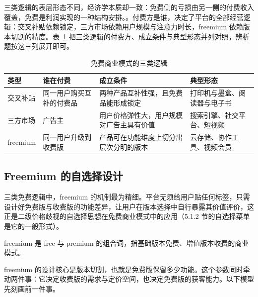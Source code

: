 三类逻辑的表层形态不同，经济学本质却一致：免费侧的亏损由另一侧的付费收入覆盖，免费是利润实现的一种结构安排。。付费方是谁，决定了平台的全部经营逻辑：交叉补贴依赖锁定，三方市场依赖用户规模与注意力时长，freemium 依赖版本切割的精度。表~\ref{tab:freemodel} 把三类逻辑的付费方、成立条件与典型形态并列对照，辨析题按这三列展开即可。

\begin{table}[H]
\centering
\setlength{\tabcolsep}{4pt}
\caption{免费商业模式的三类逻辑}
\label{tab:freemodel}
\begin{tabular}{p{1.8cm}p{3.0cm}p{3.6cm}p{3.0cm}}
\hline
\textbf{类型} & \textbf{谁在付费} & \textbf{成立条件} & \textbf{典型形态} \\
\hline
交叉补贴 & 同一用户购买互补的付费品 & 两种产品互补性强，且免费品能形成锁定 & 打印机与墨盒、阅读器与电子书 \\
三方市场 & 广告主 & 用户价格弹性大，用户规模对广告主具有价值 & 搜索引擎、社交平台、短视频 \\
freemium & 同一用户升级到收费版 & 产品可在功能维度上切分出层次分明的版本 & 云存储、协作工具、视频会员 \\
\hline
\end{tabular}
\end{table}

\subsection{Freemium 的自选择设计}

三类免费逻辑中，freemium 的机制最为精细。平台无须给用户贴任何标签，只需设计好免费版与收费版的功能差异，让用户在版本选择中自行暴露其价值评价，这正是二级价格歧视的自选择思想在免费商业模式中的应用（5.1.2 节的自选择菜单是它的一般形式）。

\begin{definition}
freemium 是 free 与 premium 的组合词，指基础版本免费、增值版本收费的商业模式。
\end{definition}

freemium 的设计核心是版本切割，也就是免费版保留多少功能。这个参数同时牵动两件事：它决定收费版的需求与定价空间，也决定免费版的获客能力。以下模型先刻画前一件事。


